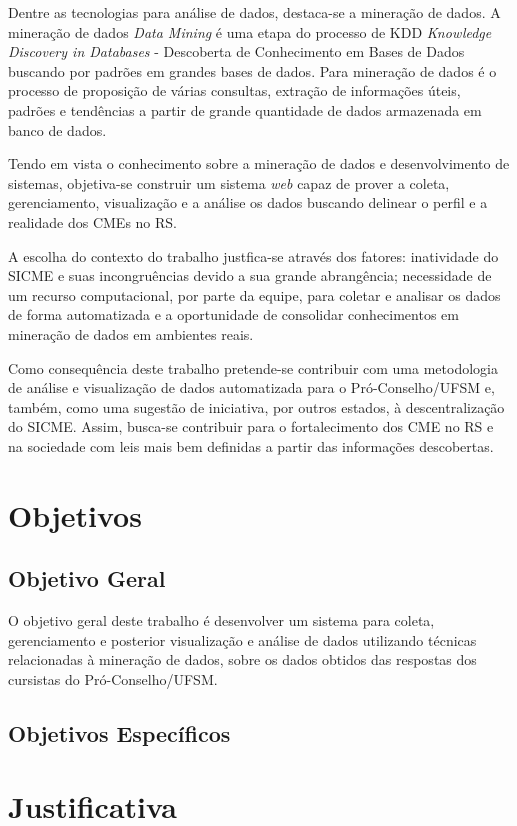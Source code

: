 \documentclass[projtg]{mdtufsm}
\begin{document}
Dentre as tecnologias para análise de dados, destaca-se a mineração de dados. A mineração de dados {\it Data Mining} é uma etapa do processo de KDD {\it Knowledge Discovery in Databases} - Descoberta de Conhecimento em Bases de Dados buscando por padrões em grandes bases de dados. Para \cite{Thuraisingham99} mineração de dados é o processo de proposição de várias consultas, extração de informações úteis, padrões e tendências a partir de grande quantidade de dados armazenada em banco de dados. 

Tendo em vista o conhecimento sobre a mineração de dados e desenvolvimento de sistemas, objetiva-se construir um sistema {\it web} capaz de prover a coleta, gerenciamento, visualização e a análise os dados buscando delinear o perfil e a realidade dos CMEs no RS.

A escolha do contexto do trabalho justfica-se através dos fatores: inatividade do SICME e suas incongruências devido a sua grande abrangência; necessidade de um recurso computacional, por parte da equipe, para coletar e analisar os dados de forma automatizada e a oportunidade de consolidar conhecimentos em mineração de dados em ambientes reais.

Como consequência deste trabalho pretende-se contribuir com uma metodologia de análise e visualização de dados automatizada para o Pró-Conselho/UFSM e, também, como uma sugestão de iniciativa, por outros estados, à descentralização do SICME. Assim, busca-se contribuir para o fortalecimento dos CME no RS e na sociedade com leis mais bem definidas a partir das informações descobertas. 

\chapter{Objetivos}
\section{Objetivo Geral}

O objetivo geral deste trabalho é desenvolver um sistema para coleta, gerenciamento e posterior visualização e análise de dados utilizando técnicas relacionadas à mineração de dados, sobre os dados obtidos das respostas dos cursistas do Pró-Conselho/UFSM. 
	
\section{Objetivos Específicos}


\chapter{Justificativa}
\end{document}
